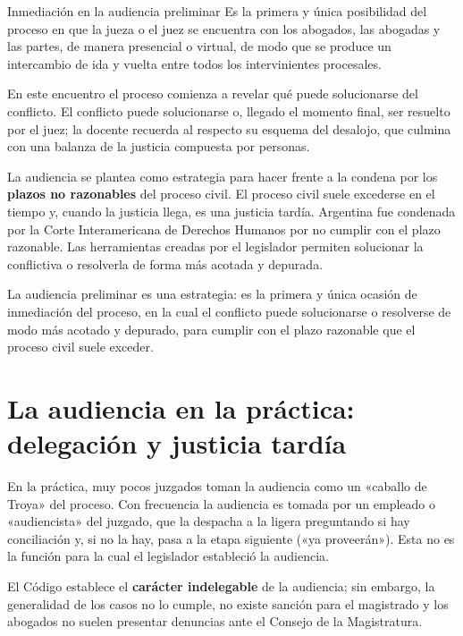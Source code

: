 \documentclass[12pt,oneside]{book}
\begin{document}
\begin{definition}{Inmediación en la audiencia preliminar}
Es la primera y única posibilidad del proceso en que la jueza o el juez se encuentra con los abogados, las abogadas y las partes, de manera presencial o virtual, de modo que se produce un intercambio de ida y vuelta entre todos los intervinientes procesales.
\end{definition}

En este encuentro el proceso comienza a revelar qué puede solucionarse del conflicto. El conflicto puede solucionarse o, llegado el momento final, ser resuelto por el juez; la docente recuerda al respecto su esquema del desalojo, que culmina con una balanza de la justicia compuesta por personas.

La audiencia se plantea como estrategia para hacer frente a la condena por los \textbf{plazos no razonables} del proceso civil. El proceso civil suele excederse en el tiempo y, cuando la justicia llega, es una justicia tardía. Argentina fue condenada por la Corte Interamericana de Derechos Humanos por no cumplir con el plazo razonable. Las herramientas creadas por el legislador permiten solucionar la conflictiva o resolverla de forma más acotada y depurada.

\begin{important}
La audiencia preliminar es una estrategia: es la primera y única ocasión de inmediación del proceso, en la cual el conflicto puede solucionarse o resolverse de modo más acotado y depurado, para cumplir con el plazo razonable que el proceso civil suele exceder.
\end{important}

\section{La audiencia en la práctica: delegación y justicia tardía}

En la práctica, muy pocos juzgados toman la audiencia como un «caballo de Troya» del proceso. Con frecuencia la audiencia es tomada por un empleado o «audiencista» del juzgado, que la despacha a la ligera preguntando si hay conciliación y, si no la hay, pasa a la etapa siguiente («ya proveerán»). Esta no es la función para la cual el legislador estableció la audiencia.

El Código establece el \textbf{carácter indelegable} de la audiencia; sin embargo, la generalidad de los casos no lo cumple, no existe sanción para el magistrado y los abogados no suelen presentar denuncias ante el Consejo de la Magistratura.
\end{document}
